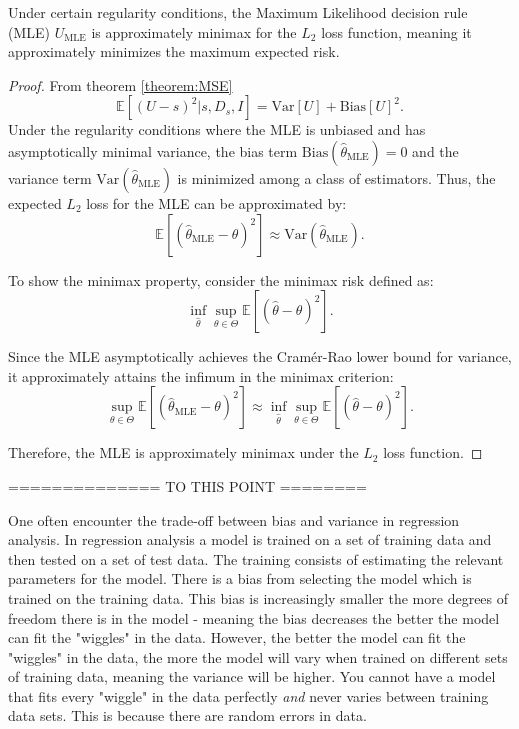 \begin{corollary}
	\label{cor:MLE_minimax}
	Under certain regularity conditions, the Maximum Likelihood decision rule (MLE) \(U_{\text{MLE}}\) is approximately minimax for the \( L_2 \) loss function, meaning it approximately minimizes the maximum expected risk.
	
	\begin{proof}
		From theorem \ref{theorem:MSE}
		\begin{equation}
			\mathbb{E}[(U-s)^2|s,D_s,I] = \text{Var}[U]+\text{Bias}[U]^2.
		\end{equation}
		Under the regularity conditions where the MLE is unbiased and has asymptotically minimal variance, the bias term \(\text{Bias}(\hat{\theta}_{\text{MLE}}) = 0\) and the variance term \(\text{Var}(\hat{\theta}_{\text{MLE}})\) is minimized among a class of estimators. Thus, the expected \( L_2 \) loss for the MLE can be approximated by:
		\begin{equation}
			\mathbb{E}[(\hat{\theta}_{\text{MLE}} - \theta)^2] \approx \text{Var}(\hat{\theta}_{\text{MLE}}).
		\end{equation}
		
		To show the minimax property, consider the minimax risk defined as:
		\begin{equation}
			\inf_{\hat{\theta}} \sup_{\theta \in \Theta} \mathbb{E}[(\hat{\theta} - \theta)^2].
		\end{equation}
		
		Since the MLE asymptotically achieves the Cramér-Rao lower bound for variance, it approximately attains the infimum in the minimax criterion:
		\begin{equation}
			\sup_{\theta \in \Theta} \mathbb{E}[(\hat{\theta}_{\text{MLE}} - \theta)^2] \approx \inf_{\hat{\theta}} \sup_{\theta \in \Theta} \mathbb{E}[(\hat{\theta} - \theta)^2].
		\end{equation}
		
		Therefore, the MLE is approximately minimax under the \( L_2 \) loss function.
	\end{proof}
\end{corollary}


============== TO THIS POINT ========


\begin{example}
	One often encounter the trade-off between bias and variance in regression analysis. In regression analysis a model is trained on a set of training data and then tested on a set of test data. The training consists of estimating the relevant parameters for the model. There is a bias from selecting the model which is trained on the training data. This bias is increasingly smaller the more degrees of freedom there is in the model - meaning the bias decreases the better the model can fit the "wiggles" in the data. However, the better the model can fit the "wiggles" in the data, the more the model will vary when trained on different sets of training data, meaning the variance will be higher. You cannot have a model that fits every "wiggle" in the data perfectly \emph{and} never varies between training data sets. This is because there are random errors in data.
\end{example}

